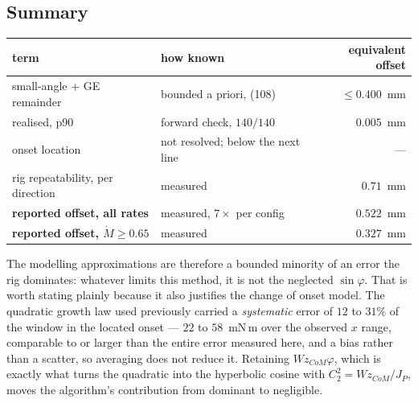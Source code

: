 \documentclass[10pt]{article}
\newcommand{\Mdot}{\dot M}
\begin{document}
\subsection{Summary}

\begin{center}\small
\begin{tabular}{@{}llr@{}}
\toprule
term & how known & equivalent offset \\
\midrule
small-angle $+$ GE remainder & bounded a priori, (108) & $\le 0.400$~mm \\
\quad realised, p90 & forward check, $140/140$ & $0.005$~mm \\
onset location & not resolved; below the next line & --- \\
rig repeatability, per direction & measured & $0.71$~mm \\
\midrule
\textbf{reported offset, all rates} & measured, $7\times$ per config
  & $\mathbf{0.522}$~mm \\
\textbf{reported offset, $\Mdot\ge0.65$} & measured & $\mathbf{0.327}$~mm \\
\bottomrule
\end{tabular}
\end{center}

The modelling approximations are therefore a bounded minority of an
error the rig dominates: whatever limits this method, it is not the
neglected $\sin\varphi$. That is worth stating plainly because it also
justifies the change of onset model. The quadratic growth law used
previously carried a \emph{systematic} error of $12$ to $31\%$ of the
window in the located onset --- $22$ to $58$~mN\,m over the observed
$x$ range, comparable to or larger than the entire error measured here,
and a bias rather than a scatter, so averaging does not reduce it.
Retaining $Wz_{CoM}\varphi$, which is exactly what turns the quadratic
into the hyperbolic cosine with $C_2^2 = Wz_{CoM}/J_P$, moves the
algorithm's contribution from dominant to negligible.
\end{document}
